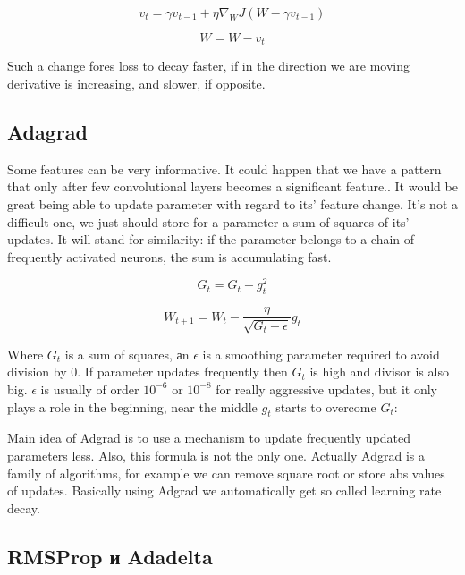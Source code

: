 \begin{equation}
    v_t = \gamma v_{t-1} + \eta \nabla_W J( W - \gamma v_{t-1} )
\end{equation}

\begin{equation}
    W = W - v_t
\end{equation}

Such a change fores loss to decay faster, if in the direction we are moving derivative is increasing, and slower, if opposite.

\subsection{Adagrad}

Some features can be very informative. It could happen that we have a pattern that only after few convolutional layers becomes a significant feature.. It would be great being able to update parameter with regard to its' feature change. It's not a difficult one, we just should store for a parameter a sum of squares of its' updates. It will stand for similarity: if the parameter belongs to a chain of frequently activated neurons, the sum is accumulating fast.

\begin{equation}
    G_{t} = G_{t} + g_{t}^2
\end{equation}

\begin{equation}
    W_{t+1} = W_{t} - \frac{\eta}{\sqrt{G_{t} + \epsilon}} g_{t}
\end{equation}

Where $G_{t}$ is a sum of squares, аn $\epsilon$ is a smoothing parameter required to avoid division by $0$. If parameter updates frequently then $G_t$ is high and divisor is also big. $\epsilon$ is usually of order $10^{-6}$ or $10^{-8}$ for really aggressive updates, but it only plays a role in the beginning, near the middle $g_t$ starts to overcome $G_t$:

Main idea of Adgrad is to use a mechanism to update frequently updated parameters less. Also, this formula is not the only one. Actually Adgrad is a family of algorithms, for example we can remove square root or store abs values of updates. Basically using Adgrad we automatically get so called learning rate decay.

\subsection{RMSProp и Adadelta}

